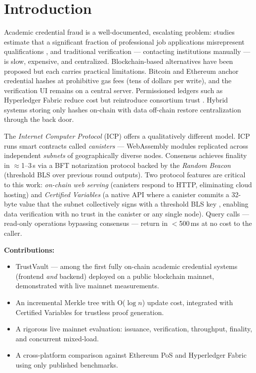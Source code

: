 \documentclass[conference]{IEEEtran}
\begin{document}
\section{Introduction}
\label{sec:intro}

Academic credential fraud is a well-documented, escalating problem: studies estimate that a significant fraction of professional job applications misrepresent qualifications \cite{chahal2021credential}, and traditional verification — contacting institutions manually — is slow, expensive, and centralized. Blockchain-based alternatives have been proposed but each carries practical limitations. Bitcoin and Ethereum anchor credential hashes at prohibitive gas fees (tens of dollars per write), and the verification UI remains on a central server. Permissioned ledgers such as Hyperledger Fabric reduce cost but reintroduce consortium trust \cite{androulaki2018fabric}. Hybrid systems storing only hashes on-chain with data off-chain restore centralization through the back door.

The \textit{Internet Computer Protocol} (ICP) \cite{hanke2018dfinity} offers a qualitatively different model. ICP runs smart contracts called \textit{canisters} — WebAssembly modules replicated across independent \textit{subnets} of geographically diverse nodes. Consensus achieves finality in $\approx$1--3\,s via a BFT notarization protocol backed by the \textit{Random Beacon} (threshold BLS over previous round outputs). Two protocol features are critical to this work: \textit{on-chain web serving} (canisters respond to HTTP, eliminating cloud hosting) and \textit{Certified Variables} (a native API where a canister commits a 32-byte value that the subnet collectively signs with a threshold BLS key \cite{dfinity2022geeks}, enabling data verification with no trust in the canister or any single node). Query calls — read-only operations bypassing consensus — return in $<$500\,ms at no cost to the caller.

\textbf{Contributions:}
\begin{itemize}
  \item TrustVault — among the first fully on-chain academic credential systems (frontend \emph{and} backend) deployed on a public blockchain mainnet, demonstrated with live mainnet measurements.
  \item An incremental Merkle tree with O($\log n$) update cost, integrated with Certified Variables for trustless proof generation.
  \item A rigorous live mainnet evaluation: issuance, verification, throughput, finality, and concurrent mixed-load.
  \item A cross-platform comparison against Ethereum PoS \cite{buterin2020eth2} and Hyperledger Fabric \cite{androulaki2018fabric} using only published benchmarks.
\end{itemize}
\end{document}
